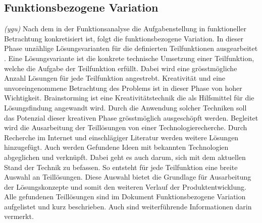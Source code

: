 \subsection{Funktionsbezogene Variation}
\textit{(ygu)} Nach dem in der Funktionsanalyse die Aufgabenstellung in funktioneller Betrachtung konkretisiert ist, folgt die funktionsbezogene Variation. In dieser Phase unzählige Lösungsvarianten für die definierten Teilfunktionen ausgearbeitet \cite{pahl}. Eine Lösungsvariante ist die konkrete technische Umsetzung einer Teilfunktion, welche die Aufgabe der Teilfunktion erfüllt. Dabei wird eine grösstmögliche Anzahl Lösungen für jede Teilfunktion angestrebt. 
\newline
Kreativität und eine unvoreingenommene Betrachtung des Problems ist in dieser Phase von hoher Wichtigkeit. Brainstorming ist eine Kreativitätstechnik die als Hilfsmittel für die Lösungsfindung angewandt wird. Durch die Anwendung solcher Techniken soll das Potenzial dieser kreativen Phase grösstmöglich ausgeschöpft werden.
\newline
Begleitet wird die Ausarbeitung der Teillösungen von einer Technologierecherche. Durch Recherche im Internet und einschlägiger Literatur werden weitere Lösungen hinzugefügt. Auch werden Gefundene Ideen mit bekannten Technologien abgeglichen und verknüpft. Dabei geht es auch darum, sich mit dem aktuellen Stand der Technik zu befassen. 
\newline
So entsteht für jede Teilfunktion eine breite Auswahl an Teillösungen. Diese Auswahl bietet die Grundlage für Ausarbeitung der Lösungskonzepte und somit den weiteren Verlauf der Produktentwicklung. Alle gefundenen Teillösungen sind im Dokument Funktionsbezogene Variation aufgelistet und kurz beschrieben. Auch sind weiterführende Informationen darin vermerkt.
